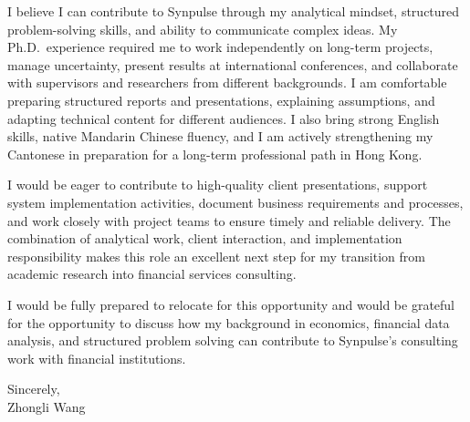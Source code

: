 \documentclass[11pt]{article}
\begin{document}
I believe I can contribute to Synpulse through my analytical mindset, structured problem-solving skills, and ability to communicate complex ideas. My Ph.D.\ experience required me to work independently on long-term projects, manage uncertainty, present results at international conferences, and collaborate with supervisors and researchers from different backgrounds. I am comfortable preparing structured reports and presentations, explaining assumptions, and adapting technical content for different audiences. I also bring strong English skills, native Mandarin Chinese fluency, and I am actively strengthening my Cantonese in preparation for a long-term professional path in Hong Kong.

I would be eager to contribute to high-quality client presentations, support system implementation activities, document business requirements and processes, and work closely with project teams to ensure timely and reliable delivery. The combination of analytical work, client interaction, and implementation responsibility makes this role an excellent next step for my transition from academic research into financial services consulting.

I would be fully prepared to relocate for this opportunity and would be grateful for the opportunity to discuss how my background in economics, financial data analysis, and structured problem solving can contribute to Synpulse's consulting work with financial institutions.

\vspace{0.15cm}

\noindent Sincerely, \\[0.5cm]
\noindent Zhongli Wang
\end{document}
